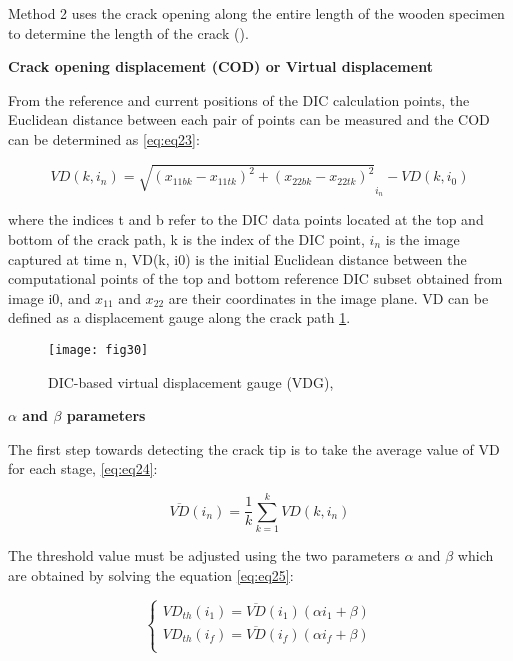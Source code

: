 Method 2 uses the crack opening along the entire length of the wooden specimen to determine the length of the crack (\cite{FilhoJ2022}). 

\textbf{Crack opening displacement (COD) or Virtual displacement}

From the reference and current positions of the DIC calculation points, the Euclidean distance between each pair of points can be measured and the COD can be determined as \ref{eq:eq23}:

\begin{equation}
	VD(k,i_n)=\sqrt{(x_{11bk}-x_{11tk})^2 + (x_{22bk}-x_{22tk})^2}_{i_n} - VD(k,i_0)
	\label{eq:eq23}
\end{equation}

where the indices t and b refer to the DIC data points located at the top and bottom of the crack path, k is the index of the DIC point, $i_n$ is the image captured at time n, VD(k, i0) is the initial Euclidean distance between the computational points of the top and bottom reference DIC subset obtained from image i0, and $x_{11}$ and $x_{22}$ are their coordinates in the image plane. VD can be defined as a displacement gauge along the crack path \ref{fig:fig30}.

\begin{figure}[htp]
	\centering
	\texttt{[image: fig30]}
	\caption{DIC-based virtual displacement gauge (VDG), \cite{FilhoJ2022}}
	\label{fig:fig30}
\end{figure}

\textbf{$\alpha$ and $\beta$ parameters}

The first step towards detecting the crack tip is to take the average value of VD for each stage, \ref{eq:eq24}:

\begin{equation}
	\overline{VD}(i_n)=\frac{1}{k} \sum_{k=1}^{k}VD(k,i_n)
	\label{eq:eq24}
\end{equation}

The threshold value must be adjusted using the two parameters $\alpha$ and $\beta$ which are obtained by solving the equation \ref{eq:eq25}:

\begin{equation}
	\begin{cases}
		VD_{th}(i_1)=\overline{VD}(i_1)(\alpha i_1 +\beta)\\
		VD_{th}(i_f)=\overline{VD}(i_f)(\alpha i_f +\beta)\\ 
	\end{cases}
\label{eq:eq25}
\end{equation}

